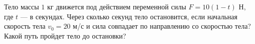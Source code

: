 Тело массы $1$ кг движется под действием переменной силы
$F=10\left(1-t\right)$ Н, где $t$ --- в секундах. Через сколько секунд
тело остановится, если начальная скорость тела $v_{0}=20$ м/с и сила
совпадает по направлению со скоростью тела? Какой путь пройдет тело
до остановки?
